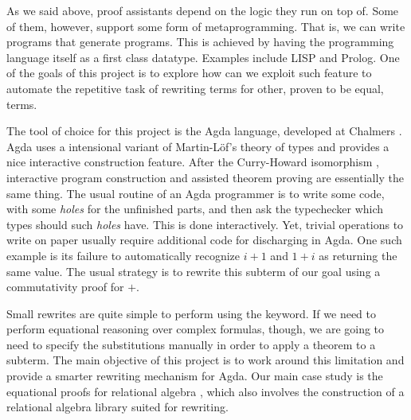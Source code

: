 As we said above, proof assistants depend on the logic they run on top of. Some of them,
however, support some form of metaprogramming. That is, we can write programs that generate
programs. This is achieved by having the programming language itself as a first class datatype.
Examples include LISP and Prolog. One of the goals of this project is to explore how can
we exploit such feature to automate the repetitive task of rewriting terms for other,
proven to be equal, terms.

The tool of choice for this project is the Agda language, developed at Chalmers \cite{norell07}. Agda uses a intensional
variant of Martin-L\"{o}f's theory of types and provides a nice interactive construction feature. After
the Curry-Howard isomorphism \cite{Howard01}, interactive program construction and assisted theorem proving are essentially
the same thing. The usual routine of an Agda programmer is to write some code, with some \emph{holes} for
the unfinished parts, and then ask the typechecker which types should such \emph{holes} have. This is done
interactively. Yet, trivial operations to write on paper usually require additional code
for discharging in Agda. One such example is its failure to automatically recognize $i + 1$ and
$1 + i$ as returning the same value. The usual strategy is to rewrite this subterm of our goal
using a commutativity proof for $+$. 

Small rewrites are quite simple to perform using the  keyword. If we need to perform
equational reasoning over complex formulas, though, we are going to need to specify the
substitutions manually in order to apply a theorem to a subterm. The main objective of this project is
to work around this limitation and provide a smarter rewriting mechanism for Agda. Our main 
case study is the equational proofs for relational algebra \cite{Bird97}, which also involves
the construction of a relational algebra library suited for rewriting.

